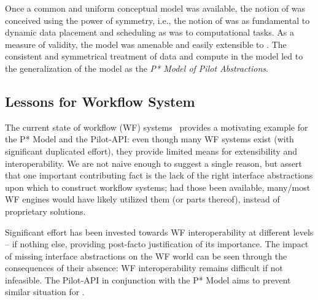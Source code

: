 \documentclass{sig-alternate}
\begin{document}
 
Once a common and uniform conceptual model was available, the notion
of \pilotdata was conceived using the power of symmetry, i.e., the
notion of \pilotdata was as fundamental to dynamic data placement and
scheduling as \pilotjobs was to computational tasks. As a measure of
validity, the \pstar model was amenable and easily extensible to
\pilotdata.  The consistent and symmetrical treatment of data and
compute in the model led to the generalization of the model as the
{\it P* Model of Pilot Abstractions}.


\subsection{Lessons for Workflow System}

The current state of workflow (WF) systems~\cite{nsf-workflow,1196459}
provides a motivating example for the P* Model and the Pilot-API: even
though many WF systems exist (with significant duplicated effort),
they provide limited means for extensibility and interoperability.  We
are not naive enough to suggest a single reason, but assert that one
important contributing fact is the lack of the right interface
abstractions upon which to construct workflow systems; had those been
available, many/most WF engines would have likely utilized them (or
parts thereof), instead of proprietary solutions.


Significant effort has been invested towards WF interoperability at
different levels -- if nothing else, providing post-facto
justification of its importance. The impact of missing interface
abstractions on the WF world can be seen through the consequences of
their absence: WF interoperability remains difficult if not
infeasible. The Pilot-API in conjunction with the P* Model aims to
prevent similar situation for \pilotjobs.





\end{document}
